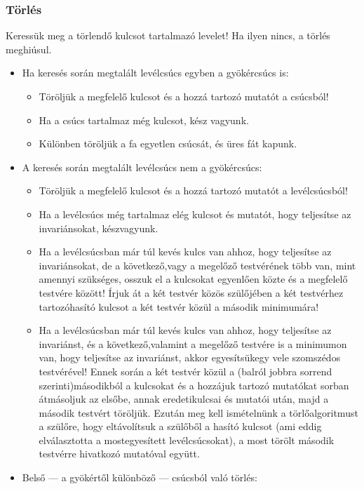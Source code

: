 \documentclass[margin=0px]{article}
\begin{document}
\subsubsection{Törlés}
Keressük meg a törlendő kulcsot tartalmazó levelet! Ha ilyen nincs, a törlés meghiúsul.
\begin{itemize}
    \item Ha keresés során megtalált levélcsúcs egyben a gyökércsúcs is:
    \begin{itemize}
        \item Töröljük a megfelelő kulcsot és a hozzá tartozó mutatót a csúcsból!
        \item Ha a csúcs tartalmaz még kulcsot, kész vagyunk.
        \item Különben töröljük a fa egyetlen csúcsát, és üres fát kapunk.
    \end{itemize}
    \item  A keresés során megtalált levélcsúcs nem a gyökércsúcs:
    \begin{itemize}
        \item Töröljük a megfelelő kulcsot és a hozzá tartozó mutatót a levélcsúcsból!
        \item Ha a levélcsúcs még tartalmaz elég kulcsot és mutatót, hogy teljesítse az invariánsokat, készvagyunk.
        \item Ha a levélcsúcsban már túl kevés kulcs van ahhoz, hogy teljesítse az invariánsokat, de a következő,vagy a megelőző testvérének több van, mint amennyi szükséges, osszuk el a kulcsokat egyenlően közte és a megfelelő testvére között! Írjuk át a két testvér közös szülőjében a két testvérhez tartozóhasító kulcsot a két testvér közül a második minimumára!
        \item Ha a levélcsúcsban már túl kevés kulcs van ahhoz, hogy teljesítse az invariánst, és a következő,valamint a megelőző testvére is a minimumon van, hogy teljesítse az invariánst, akkor egyesítsükegy vele szomszédos testvérével! Ennek során a két testvér közül a (balról jobbra sorrend szerinti)másodikból a kulcsokat és a hozzájuk tartozó mutatókat sorban átmásoljuk az elsőbe, annak eredetikulcsai és mutatói után, majd a második testvért töröljük. Ezután meg kell ismételnünk a törlőalgoritmust a szülőre, hogy eltávolítsuk a szülőből a hasító kulcsot (ami eddig elválasztotta a mostegyesített levélcsúcsokat), a most törölt második testvérre hivatkozó mutatóval együtt. 
    \end{itemize}
    \item Belső — a gyökértől különböző — csúcsból való törlés:

\end{itemize}
\end{document}
